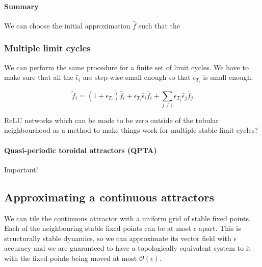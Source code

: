 \documentclass{article}
\theoremstyle{definition}
\theoremstyle{remark}
\newcounter{ct}
\begin{document}
\paragraph{Summary}
We can choose the initial approximation $\hat{f}$ such that the 



\subsubsection{Multiple limit cycles}
We can perform the same procedure for a finite set of limit cycles.
We have to make sure that all the $\hat{\epsilon}_i$ are step-wise small enough so that $\epsilon_{T_i}$ is small enough. 

\[ \tilde f_i = (1+ \epsilon_{T_i})\hat{f}_i + \epsilon_{T_i}\hat{\epsilon}_i\bar{f}_i + \sum_{j\neq i}\epsilon_{T_j}\hat{\epsilon}_j\bar{f}_j\]


 ReLU networks which can be made to be zero outside of the tubular neighbourhood as a method to make things work for multiple stable limit cycles?

\paragraph{Quasi-periodic toroidal attractors (QPTA)}%
Important!\citep{Park2023a}




\subsection{Approximating a continuous attractors}\label{sec:chaos}

We can tile the continuous attractor with a uniform grid of stable fixed points.
Each of the neighbouring stable fixed points can be at most $\epsilon$ apart.
This is structurally stable dynamics, so we can approximate its vector field with $\epsilon$ accuracy and we are guaranteed to have a topologically equivalent system to it with the fixed points being moved at most $\mathcal{O}(\epsilon)$.
\end{document}

